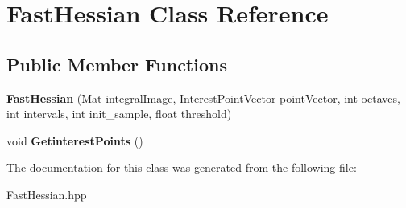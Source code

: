 \hypertarget{classFastHessian}{\section{Fast\-Hessian Class Reference}
\label{classFastHessian}
}
\subsection*{Public Member Functions}
\begin{DoxyCompactItemize}
\item 
\hypertarget{classFastHessian_a10335f4aea8a4a7c0acd36475000dfa4}{{\bfseries Fast\-Hessian} (Mat integral\-Image, Interest\-Point\-Vector point\-Vector, int octaves, int intervals, int init\-\_\-sample, float threshold)}\label{classFastHessian_a10335f4aea8a4a7c0acd36475000dfa4}

\item 
\hypertarget{classFastHessian_a97f0b120c1c6c647af259b69eeb7d3b2}{void {\bfseries Getinterest\-Points} ()}\label{classFastHessian_a97f0b120c1c6c647af259b69eeb7d3b2}

\end{DoxyCompactItemize}


The documentation for this class was generated from the following file\-:\begin{DoxyCompactItemize}
\item 
Fast\-Hessian.\-hpp\end{DoxyCompactItemize}
